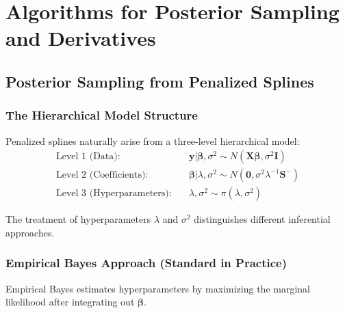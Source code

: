 \documentclass[12pt]{article}
\begin{document}
\section{Algorithms for Posterior Sampling and Derivatives}

\subsection{Posterior Sampling from Penalized Splines}

\subsubsection{The Hierarchical Model Structure}

Penalized splines naturally arise from a three-level hierarchical model:
\begin{align}
\text{Level 1 (Data):} \quad & \mathbf{y} | \boldsymbol{\beta}, \sigma^2 \sim N(\mathbf{X}\boldsymbol{\beta}, \sigma^2\mathbf{I}) \\
\text{Level 2 (Coefficients):} \quad & \boldsymbol{\beta} | \lambda, \sigma^2 \sim N(\mathbf{0}, \sigma^2\lambda^{-1}\mathbf{S}^{-}) \\
\text{Level 3 (Hyperparameters):} \quad & \lambda, \sigma^2 \sim \pi(\lambda, \sigma^2)
\end{align}

The treatment of hyperparameters $\lambda$ and $\sigma^2$ distinguishes different inferential approaches.

\subsubsection{Empirical Bayes Approach (Standard in Practice)}

Empirical Bayes estimates hyperparameters by maximizing the marginal likelihood after integrating out $\boldsymbol{\beta}$.
\end{document}
